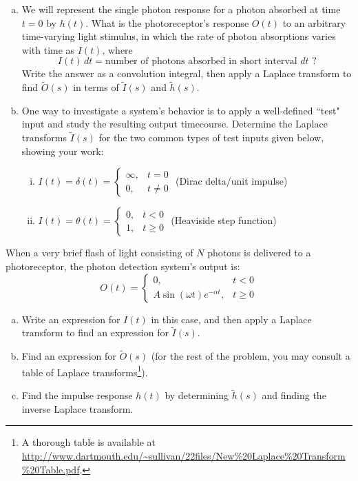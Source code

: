 \documentclass{article}
\begin{document}
\begin{enumerate}[a)]
\setlength{\itemsep}{0pt}
\item  We will represent the single photon response for a photon absorbed at time $t=0$ by $h(t)$. What is the photoreceptor's response $O(t)$ to an arbitrary time-varying light stimulus, in which the rate of photon absorptions varies with time as $I(t)$, where
\[ I(t) \, dt = \textrm{number of photons absorbed in short interval } dt \textrm{ ?} \]
Write the answer as a convolution integral, then apply a Laplace transform to find $\tilde{O}(s)$ in terms of $\tilde{I}(s)$ and $\tilde{h}(s)$.
\item One way to investigate a system's behavior is to apply a well-defined ``test" input and study the resulting output timecourse. Determine the Laplace transforms $\tilde{I}(s)$ for the two common types of test inputs given below, showing your work:
\begin{enumerate}[i)]
\setlength{\itemsep}{0pt}
\item  $I(t) = \delta(t)= \left\{
     \begin{array}{lr}
       \infty, & t = 0 \\
       0, & t \neq 0
     \end{array}
   \right.$ (Dirac delta/unit impulse)
\item  $I(t) = \theta(t)= \left\{
     \begin{array}{lr}
       0, & t < 0 \\
       1, & t \geq 0
     \end{array}
   \right.$ (Heaviside step function)
\end{enumerate}
\end{enumerate}
When a very brief flash of light consisting of $N$ photons is delivered to a photoreceptor, the photon detection system's output is:
\[ O(t) = \left\{
     \begin{array}{lr}
       0, & t < 0 \\
       A \sin \left( \omega t \right) e^{-\alpha t}, & t \geq 0
     \end{array}
   \right. \]   
   \begin{enumerate}[a)]
\setlength{\itemsep}{0pt}
\setcounter{enumi}{2}
\item Write an expression for $I(t)$ in this case, and then apply a Laplace transform to find an expression for $\tilde{I}(s)$.
\item Find an expression for $\tilde{O}(s)$ (for the rest of the problem, you may consult a table of Laplace transforms\footnote{A thorough table is available at \url{http://www.dartmouth.edu/\~sullivan/22files/New\%20Laplace\%20Transform\%20Table.pdf}.}). 
\item Find the impulse response $h(t)$ by determining $\tilde{h}(s)$ and finding the inverse Laplace transform.
\end{enumerate}
\end{document}
